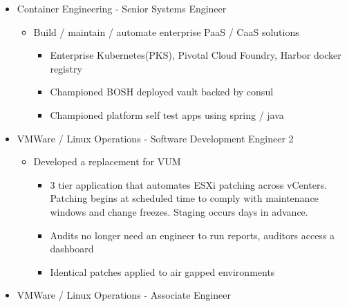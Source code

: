 \documentclass{book}
\newenvironment{myitemize}
{ \begin{itemize}
	\setlength{\itemsep}{0pt}
	\setlength{\parskip}{0pt}
	\setlength{\parsep}{0pt}     }
{ \end{itemize}                  }
\begin{document}
	\begin{myitemize}

		\item Container Engineering - Senior Systems Engineer

			\begin{myitemize}

					\item Build / maintain / automate enterprise PaaS / CaaS solutions 

						\begin{myitemize}
							
							\item Enterprise Kubernetes(PKS), Pivotal Cloud Foundry, Harbor docker registry

							\item Championed BOSH deployed vault backed by consul
								
							\item Championed platform self test apps using spring / java

						\end{myitemize}

			\end{myitemize}

		\item VMWare / Linux Operations - Software Development Engineer 2

			\begin{myitemize}

					\item Developed a replacement for VUM

						\begin{myitemize}
							
							\item 3 tier application that automates ESXi patching across vCenters. Patching begins at scheduled time to comply with maintenance windows and change freezes. Staging occurs days in advance. 

							\item Audits no longer need an engineer to run reports, auditors access a dashboard

							\item Identical patches applied to air gapped environments


						\end{myitemize}

			\end{myitemize}	

		\item VMWare / Linux Operations - Associate Engineer 


\end{myitemize}
\end{document}
